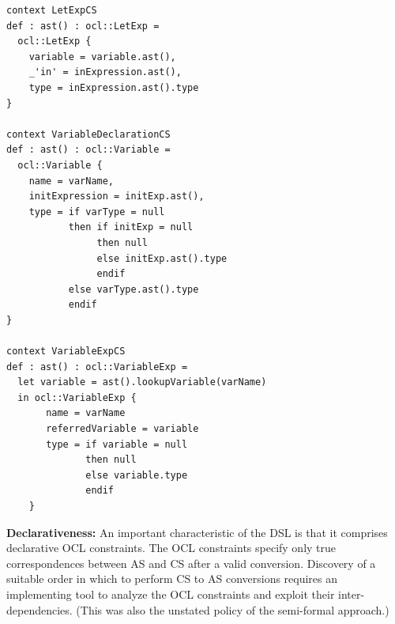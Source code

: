 \documentclass{llncs}
\begin{document}
\begin{lstlisting}[caption=CS2AS description for running example, label=lst:exampleCS2ASdesc, language=OCL]
context LetExpCS
def : ast() : ocl::LetExp = 
  ocl::LetExp {
    variable = variable.ast(),
    _'in' = inExpression.ast(),
    type = inExpression.ast().type
}

context VariableDeclarationCS
def : ast() : ocl::Variable = 
  ocl::Variable {
    name = varName,
    initExpression = initExp.ast(),
    type = if varType = null
           then if initExp = null
                then null
                else initExp.ast().type
                endif
           else varType.ast().type
           endif
}

context VariableExpCS
def : ast() : ocl::VariableExp =
  let variable = ast().lookupVariable(varName)
  in ocl::VariableExp {
       name = varName
       referredVariable = variable
       type = if variable = null
              then null
       	      else variable.type
       	      endif
   	}
\end{lstlisting}



\textbf{Declarativeness:} An important characteristic of the DSL is that it comprises declarative OCL constraints. The OCL constraints specify only true correspondences between AS and CS after a valid conversion. Discovery of a suitable order in which to perform CS to AS conversions requires an implementing tool to analyze the OCL constraints and exploit their inter-dependencies. (This was also the unstated policy of the semi-formal approach.)
\end{document}
